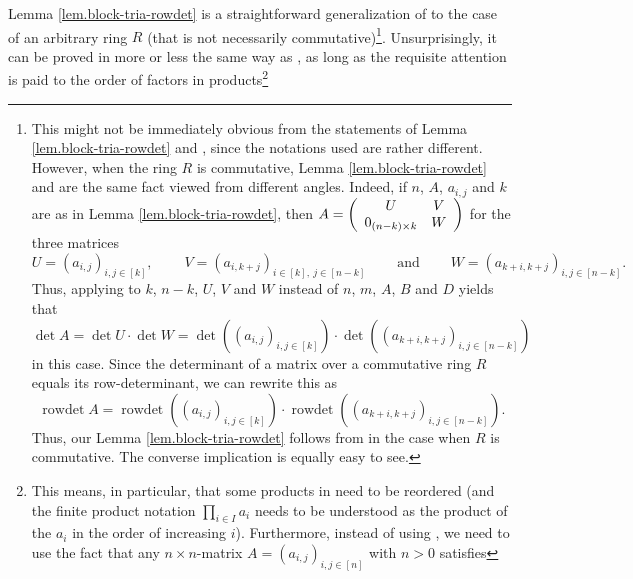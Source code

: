 \documentclass
[numbers=enddot,12pt,final,onecolumn,notitlepage,english]{scrartcl}%
\theoremstyle{definition}
\let\prodnonlimits\prod
\renewcommand{\prod}{\prodnonlimits\limits}
\newenvironment{verlong}{}{}
\begin{document}
\begin{verlong}
Lemma \ref{lem.block-tria-rowdet} is a straightforward generalization of
\cite[Exercise 6.29]{detnotes} to the case of an arbitrary ring $R$ (that is
not necessarily commutative)\footnote{This might not be immediately obvious
from the statements of Lemma \ref{lem.block-tria-rowdet} and \cite[Exercise
6.29]{detnotes}, since the notations used are rather different. However, when
the ring $R$ is commutative, Lemma \ref{lem.block-tria-rowdet} and
\cite[Exercise 6.29]{detnotes} are the same fact viewed from different angles.
Indeed, if $n$, $A$, $a_{i,j}$ and $k$ are as in Lemma
\ref{lem.block-tria-rowdet}, then $A=\left(
\begin{array}
[c]{cc}%
U & V\\
0_{\left(  n-k\right)  \times k} & W
\end{array}
\right)  $ for the three matrices%
\[
U=\left(  a_{i,j}\right)  _{i,j\in\left[  k\right]  }%
,\ \ \ \ \ \ \ \ \ \ V=\left(  a_{i,k+j}\right)  _{i\in\left[  k\right]
,\ j\in\left[  n-k\right]  }\ \ \ \ \ \ \ \ \ \ \text{and}%
\ \ \ \ \ \ \ \ \ \ W=\left(  a_{k+i,k+j}\right)  _{i,j\in\left[  n-k\right]
}.
\]
Thus, applying \cite[Exercise 6.29]{detnotes} to $k$, $n-k$, $U$, $V$ and $W$
instead of $n$, $m$, $A$, $B$ and $D$ yields that%
\[
\det A=\det U\cdot\det W=\det\left(  \left(  a_{i,j}\right)  _{i,j\in\left[
k\right]  }\right)  \cdot\det\left(  \left(  a_{k+i,k+j}\right)
_{i,j\in\left[  n-k\right]  }\right)
\]
in this case. Since the determinant of a matrix over a commutative ring $R$
equals its row-determinant, we can rewrite this as%
\[
\operatorname*{rowdet}A=\operatorname*{rowdet}\left(  \left(  a_{i,j}\right)
_{i,j\in\left[  k\right]  }\right)  \cdot\operatorname*{rowdet}\left(  \left(
a_{k+i,k+j}\right)  _{i,j\in\left[  n-k\right]  }\right)  .
\]
Thus, our Lemma \ref{lem.block-tria-rowdet} follows from \cite[Exercise
6.29]{detnotes} in the case when $R$ is commutative. The converse implication
is equally easy to see.}. Unsurprisingly, it can be proved in more or less the
same way as \cite[Exercise 6.29]{detnotes}, as long as the requisite attention
is paid to the order of factors in products\footnote{This means, in
particular, that some products in \cite[solution to Exercise 6.29]{detnotes}
need to be reordered (and the finite product notation $\prod_{i\in I}a_{i}$
needs to be understood as the product of the $a_{i}$ in the order of
increasing $i$). Furthermore, instead of using \cite[Theorem 6.82
\textbf{(a)}]{detnotes}, we need to use the fact that any $n\times n$-matrix
$A=\left(  a_{i,j}\right)  _{i,j\in\left[  n\right]  }$ with $n>0$ satisfies%
}
\end{verlong}
\end{document}
